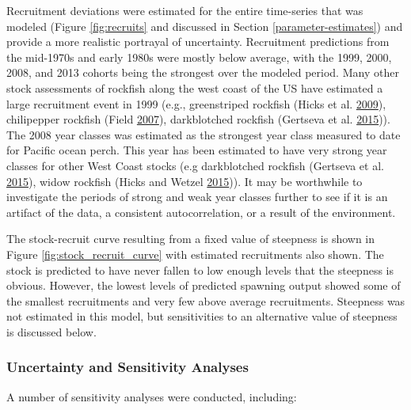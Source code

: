 \documentclass[12pt,]{article}
\begin{document}
Recruitment deviations were estimated for the entire time-series that
was modeled (Figure \ref{fig:recruits} and discussed in Section
\ref{parameter-estimates}) and provide a more realistic portrayal of
uncertainty. Recruitment predictions from the mid-1970s and early 1980s
were mostly below average, with the 1999, 2000, 2008, and 2013 cohorts
being the strongest over the modeled period. Many other stock
assessments of rockfish along the west coast of the US have estimated a
large recruitment event in 1999 (e.g., greenstriped rockfish (Hicks et
al. \protect\hyperlink{ref-hicks_status_2009}{2009}), chilipepper
rockfish (Field \protect\hyperlink{ref-field_status_2007}{2007}),
darkblotched rockfish (Gertseva et al.
\protect\hyperlink{ref-gertseva_status_2015}{2015})). The 2008 year
classes was estimated as the strongest year class measured to date for
Pacific ocean perch. This year has been estimated to have very strong
year classes for other West Coast stocks (e.g darkblotched rockfish
(Gertseva et al. \protect\hyperlink{ref-gertseva_status_2015}{2015}),
widow rockfish (Hicks and Wetzel
\protect\hyperlink{ref-hicks_status_2015}{2015})). It may be worthwhile
to investigate the periods of strong and weak year classes further to
see if it is an artifact of the data, a consistent autocorrelation, or a
result of the environment.

The stock-recruit curve resulting from a fixed value of steepness is
shown in Figure \ref{fig:stock_recruit_curve} with estimated
recruitments also shown. The stock is predicted to have never fallen to
low enough levels that the steepness is obvious. However, the lowest
levels of predicted spawning output showed some of the smallest
recruitments and very few above average recruitments. Steepness was not
estimated in this model, but sensitivities to an alternative value of
steepness is discussed below.

\subsubsection{Uncertainty and Sensitivity
Analyses}\label{uncertainty-and-sensitivity-analyses}

A number of sensitivity analyses were conducted, including:
\end{document}
